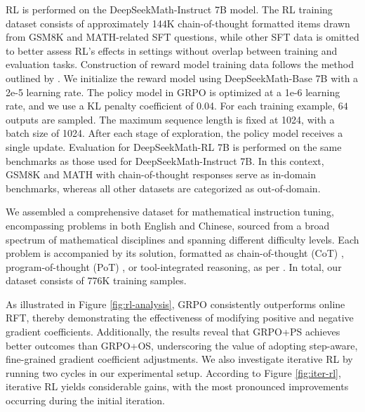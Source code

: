 RL is performed on the DeepSeekMath-Instruct 7B model. The RL training dataset consists of approximately 144K chain-of-thought formatted items drawn from GSM8K and MATH-related SFT questions, while other SFT data is omitted to better assess RL’s effects in settings without overlap between training and evaluation tasks. Construction of reward model training data follows the method outlined by \citep{wang2023math}. We initialize the reward model using DeepSeekMath-Base 7B with a 2e-5 learning rate. The policy model in GRPO is optimized at a 1e-6 learning rate, and we use a KL penalty coefficient of 0.04. For each training example, $64$ outputs are sampled. The maximum sequence length is fixed at 1024, with a batch size of 1024. After each stage of exploration, the policy model receives a single update. Evaluation for DeepSeekMath-RL 7B is performed on the same benchmarks as those used for DeepSeekMath-Instruct 7B. In this context, GSM8K and MATH with chain-of-thought responses serve as in-domain benchmarks, whereas all other datasets are categorized as out-of-domain.

We assembled a comprehensive dataset for mathematical instruction tuning, encompassing problems in both English and Chinese, sourced from a broad spectrum of mathematical disciplines and spanning different difficulty levels. Each problem is accompanied by its solution, formatted as chain-of-thought (CoT) \citep{cot}, program-of-thought (PoT) \citep{pot,pal}, or tool-integrated reasoning, as per \citep{tora}. In total, our dataset consists of 776K training samples.

As illustrated in Figure \ref{fig:rl-analysis}, GRPO consistently outperforms online RFT, thereby demonstrating the effectiveness of modifying positive and negative gradient coefficients. Additionally, the results reveal that GRPO+PS achieves better outcomes than GRPO+OS, underscoring the value of adopting step-aware, fine-grained gradient coefficient adjustments. We also investigate iterative RL by running two cycles in our experimental setup. According to Figure \ref{fig:iter-rl}, iterative RL yields considerable gains, with the most pronounced improvements occurring during the initial iteration.

